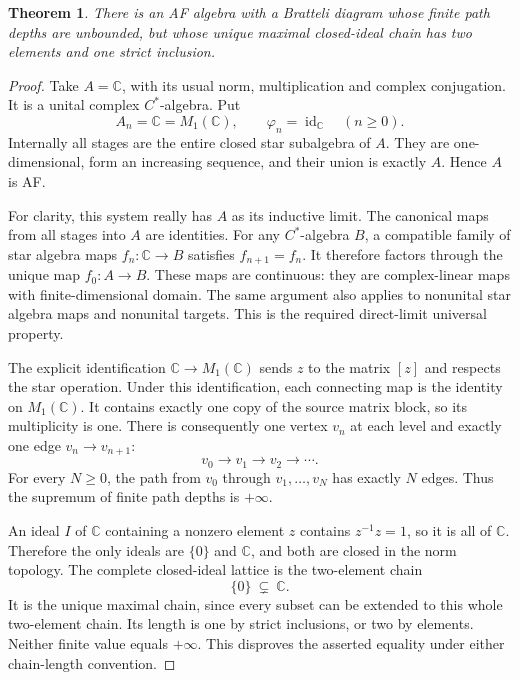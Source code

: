 \documentclass[11pt]{article}
\newtheorem{theorem}{Theorem}
\begin{document}
\begin{theorem}
There is an AF algebra with a Bratteli diagram whose finite path
depths are unbounded, but whose unique maximal closed-ideal chain
has two elements and one strict inclusion.
\end{theorem}
\begin{proof}
Take $A=\mathbb C$, with its usual norm, multiplication and complex
conjugation. It is a unital complex $C^*$-algebra. Put
\[
 A_n=\mathbb C=M_1(\mathbb C),\qquad
 \varphi_n=\operatorname{id}_{\mathbb C}\quad(n\geq0).
\]
Internally all stages are the entire closed star subalgebra of $A$.
They are one-dimensional, form an increasing sequence, and their
union is exactly $A$. Hence $A$ is AF.

For clarity, this system really has $A$ as its inductive limit.
The canonical maps from all stages into $A$ are identities. For
any $C^*$-algebra $B$, a compatible family of star algebra maps
$f_n:\mathbb C\to B$ satisfies $f_{n+1}=f_n$. It therefore factors
through the unique map $f_0:A\to B$. These maps are continuous:
they are complex-linear maps with finite-dimensional domain.
The same argument also applies to nonunital star algebra maps and
nonunital targets. This is the required direct-limit universal property.

The explicit identification $\mathbb C\to M_1(\mathbb C)$ sends
$z$ to the matrix $[z]$ and respects the star operation. Under this
identification, each connecting map is the identity on $M_1(\mathbb C)$.
It contains exactly one copy of the source matrix block, so its
multiplicity is one. There is consequently one vertex $v_n$ at each
level and exactly one edge $v_n\to v_{n+1}$:
\[
 v_0\longrightarrow v_1\longrightarrow v_2\longrightarrow\cdots.
\]
For every $N\geq0$, the path from $v_0$ through $v_1,\ldots,v_N$
has exactly $N$ edges. Thus the supremum of finite path depths is
$+\infty$.

An ideal $I$ of $\mathbb C$ containing a nonzero element $z$ contains
$z^{-1}z=1$, so it is all of $\mathbb C$. Therefore the only ideals
are $\{0\}$ and $\mathbb C$, and both are closed in the norm topology.
The complete closed-ideal lattice is the two-element chain
\[
 \{0\}\ \subsetneq\ \mathbb C.
\]
It is the unique maximal chain, since every subset can be extended
to this whole two-element chain. Its length is one by strict
inclusions, or two by elements. Neither finite value equals
$+\infty$. This disproves the asserted equality under either
chain-length convention.
\end{proof}
\end{document}
